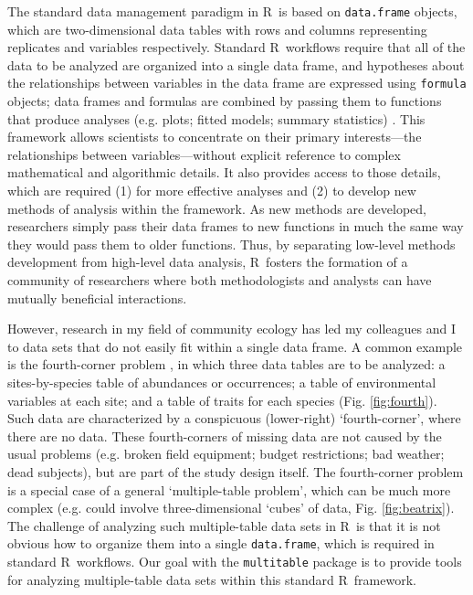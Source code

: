 \documentclass{article}
\newcommand{\R}{{\sf R}}
\newcommand{\code}[1]{\texttt{#1}}
\numberwithin{exercise}{section}
\begin{document}
The standard data management paradigm in \R\ is based on \code{data.frame} objects, which are two-dimensional data tables with rows and columns representing replicates and variables respectively.  Standard \R\ workflows require that all of the data to be analyzed are organized into a single data frame, and hypotheses about the relationships between variables in the data frame are expressed using \code{formula} objects; data frames and formulas are combined by passing them to functions that produce analyses (e.g. plots; fitted models; summary statistics) \citep{ChambersAndHastie1992}.  This framework allows scientists to concentrate on their primary interests---the relationships between variables---without explicit reference to complex mathematical and algorithmic details.  It also provides access to those details, which are required (1) for more effective analyses and (2) to develop new methods of analysis within the framework.  As new methods are developed, researchers simply pass their data frames to new functions in much the same way they would pass them to older functions.  Thus, by separating low-level methods development from high-level data analysis, \R\ fosters the formation of a community of researchers where both methodologists and analysts can have mutually beneficial interactions.

However, research in my field of community ecology has led my colleagues and I to data sets that do not easily fit within a single data frame.  A common example is the fourth-corner problem \citep{LegendreEtAl1997}, in which three data tables are to be analyzed: a sites-by-species table of abundances or occurrences; a table of environmental variables at each site; and a table of traits for each species (Fig. \ref{fig:fourth}).  Such data are characterized by a conspicuous (lower-right) `fourth-corner', where there are no data.  These fourth-corners of missing data are not caused by the usual problems (e.g. broken field equipment; budget restrictions; bad weather; dead subjects), but are part of the study design itself.  The fourth-corner problem is a special case of a general `multiple-table problem', which can be much more complex (e.g. could involve three-dimensional `cubes' of data, Fig. \ref{fig:beatrix}).  The challenge of analyzing such multiple-table data sets in \R\ is that it is not obvious how to organize them into a single \code{data.frame}, which is required in standard \R\ workflows.  Our goal with the \code{multitable} package is to provide tools for analyzing multiple-table data sets within this standard \R\ framework.
\end{document}
